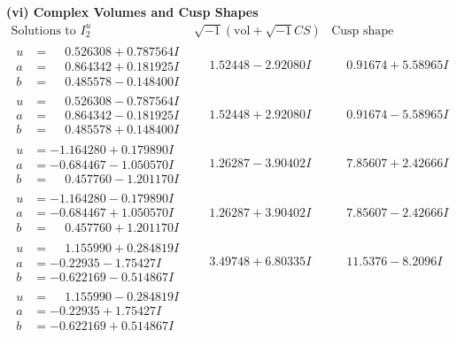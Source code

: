\documentclass[1p]{elsarticle_modified}
\theoremstyle{definition}
\newcommand{\I}{\sqrt{-1}}
\begin{document}
\newpage\flushleft \textbf{(vi) Complex Volumes and Cusp Shapes}
$$\begin{array}{c|c|c}  
\text{Solutions to }I^u_{2}& \I (\text{vol} + \sqrt{-1}CS) & \text{Cusp shape}\\
 \hline 
\begin{aligned}
u &= \phantom{-}0.526308 + 0.787564 I \\
a &= \phantom{-}0.864342 + 0.181925 I \\
b &= \phantom{-}0.485578 - 0.148400 I\end{aligned}
 & \phantom{-}1.52448 - 2.92080 I & \phantom{-}0.91674 + 5.58965 I \\ \hline\begin{aligned}
u &= \phantom{-}0.526308 - 0.787564 I \\
a &= \phantom{-}0.864342 - 0.181925 I \\
b &= \phantom{-}0.485578 + 0.148400 I\end{aligned}
 & \phantom{-}1.52448 + 2.92080 I & \phantom{-}0.91674 - 5.58965 I \\ \hline\begin{aligned}
u &= -1.164280 + 0.179890 I \\
a &= -0.684467 - 1.050570 I \\
b &= \phantom{-}0.457760 - 1.201170 I\end{aligned}
 & \phantom{-}1.26287 - 3.90402 I & \phantom{-}7.85607 + 2.42666 I \\ \hline\begin{aligned}
u &= -1.164280 - 0.179890 I \\
a &= -0.684467 + 1.050570 I \\
b &= \phantom{-}0.457760 + 1.201170 I\end{aligned}
 & \phantom{-}1.26287 + 3.90402 I & \phantom{-}7.85607 - 2.42666 I \\ \hline\begin{aligned}
u &= \phantom{-}1.155990 + 0.284819 I \\
a &= -0.22935 - 1.75427 I \\
b &= -0.622169 - 0.514867 I\end{aligned}
 & \phantom{-}3.49748 + 6.80335 I & \phantom{-}11.5376 - 8.2096 I \\ \hline\begin{aligned}
u &= \phantom{-}1.155990 - 0.284819 I \\
a &= -0.22935 + 1.75427 I \\
b &= -0.622169 + 0.514867 I\end{aligned}

\end{array}$$
\end{document}
